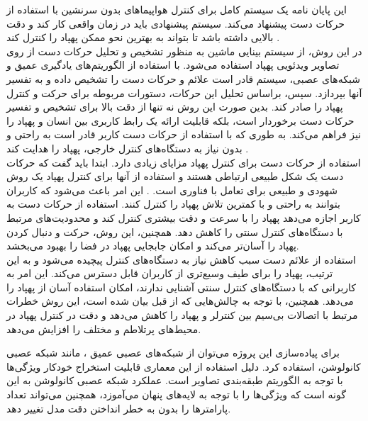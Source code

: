 این پایان نامه یک سیستم کامل برای کنترل هواپیماهای بدون سرنشین 
با استفاده از حرکات دست پیشنهاد می‌کند. سیستم پیشنهادی باید در زمان واقعی کار کند و دقت بالایی داشته باشد تا بتواند به بهترین نحو ممکن پهپاد را کنترل کند \cite{hadri2018hand}.
\\
در این روش، از سیستم بینایی ماشین به منظور تشخیص و تحلیل حرکات دست از روی تصاویر ویدئویی پهپاد استفاده می‌شود. با استفاده از الگوریتم‌های یادگیری عمیق و شبکه‌های عصبی، سیستم 
قادر است علائم و حرکات دست را تشخیص داده و به تفسیر آنها بپردازد. سپس، براساس تحلیل این حرکات، دستورات مربوطه برای حرکت و کنترل پهپاد را صادر کند.
بدین صورت این روش نه تنها از دقت بالا برای تشخیص و تفسیر حرکات دست برخوردار است، بلکه قابلیت ارائه یک رابط کاربری بین انسان و پهپاد را نیز فراهم می‌کند. 
به طوری که با استفاده از حرکات دست کاربر قادر است به راحتی و بدون نیاز به دستگاه‌های کنترل خارجی، پهپاد را هدایت کند \cite{yoo2022motion}.
\\
استفاده از حرکات دست برای کنترل پهپاد مزایای زیادی دارد. ابتدا باید گفت که حرکات دست یک شکل طبیعی ارتباطی هستند و استفاده از آنها برای کنترل پهپاد یک روش شهودی و طبیعی برای تعامل با فناوری است.
. این امر باعث می‌شود که کاربران بتوانند به راحتی و با کمترین تلاش پهپاد را کنترل کنند. استفاده از حرکات دست به کاربر اجازه می‌دهد پهپاد را با سرعت و دقت
بیشتری کنترل کند و محدودیت‌های مرتبط با دستگاه‌های کنترل سنتی را کاهش دهد. همچنین، این روش، حرکت و دنبال کردن پهپاد را آسان‌تر می‌کند و امکان جابجایی پهپاد در فضا را بهبود می‌بخشد.
\\
استفاده از علائم دست سبب کاهش نیاز به دستگاه‌های کنترل پیچیده می‌شود و به این ترتیب، پهپاد را برای طیف وسیع‌تری از کاربران قابل دسترس می‌کند.
این امر به کاربرانی که با دستگاه‌های کنترل سنتی آشنایی ندارند، امکان استفاده آسان از پهپاد را می‌دهد. همچنین، با توجه به چالش‌هایی که از قبل بیان شده است، 
این روش خطرات مرتبط با اتصالات بی‌سیم بین کنترلر و پهپاد را کاهش می‌دهد و دقت در کنترل پهپاد در محیط‌های پرتلاطم و مختلف را افزایش می‌دهد. 


برای پیاده‌سازی این پروژه می‌توان از شبکه‌های عصبی عمیق 
، مانند شبکه عصبی کانولوشن، استفاده کرد. دلیل استفاده از این معماری قابلیت استخراج خودکار ویژگی‌ها با توجه به الگوریتم طبقه‌بندی تصاویر
است. عملکرد شبکه عصبی کانولوشن به این گونه است که ویژگی‌ها را با توجه به لایه‌های پنهان می‌آموزد، همچنین می‌تواند تعداد پارامترها را بدون به خطر انداختن دقت مدل تغییر دهد.

